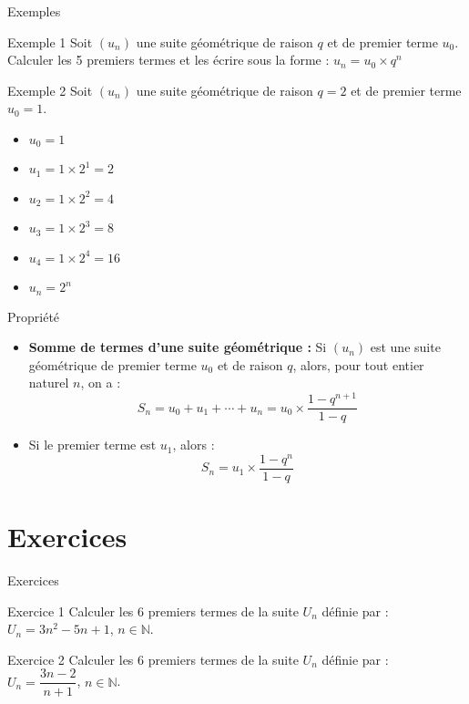 \documentclass{beamer}
\begin{document}
\begin{frame}{Exemples}
    \begin{exampleblock}{Exemple 1}
        Soit $\left(u_{n}\right)$ une suite géométrique de raison $q$ et de premier terme $u_{0}$. Calculer les 5 premiers termes et les écrire sous la forme : $u_{n}=u_{0}\times q^{n}$
    \end{exampleblock}
    \begin{exampleblock}{Exemple 2}
        Soit $\left(u_{n}\right)$ une suite géométrique de raison $q=2$ et de premier terme $u_{0}=1$. 
        \begin{itemize}
            \item $u_{0}=1$
            \item $u_{1}=1\times 2^{1}=2$
            \item $u_{2}=1\times 2^{2}=4$
            \item $u_{3}=1\times 2^{3}=8$
            \item $u_{4}=1\times 2^{4}=16$
            \item $u_{n}=2^{n}$
        \end{itemize}
    \end{exampleblock}
\end{frame}

\begin{frame}{Propriété}
    \begin{itemize}
        \item \textbf{Somme de termes d'une suite géométrique :}
            Si $\left(u_{n}\right)$ est une suite géométrique de premier terme $u_{0}$ et de raison $q$, alors, pour tout entier naturel $n$, on a :
            \[
            S_{n}=u_{0}+u_{1}+\cdots +u_{n}=u_{0}\times \dfrac{1-q^{n+1}}{1-q}
            \]
        \item Si le premier terme est $u_{1}$, alors :
            \[
            S_{n}=u_{1}\times \dfrac{1-q^{n}}{1-q}
            \]
    \end{itemize}
\end{frame}

\section{Exercices}
\begin{frame}{Exercices}
    \begin{exampleblock}{Exercice 1}
        Calculer les $6$ premiers termes de la suite $U_{n}$ définie par : \\
        $U_{n}=3n^{2} - 5n + 1$, $n \in \mathbb{N}$.
    \end{exampleblock}
    \begin{exampleblock}{Exercice 2}
        Calculer les $6$ premiers termes de la suite $U_{n}$ définie par : \\
        $U_{n}=\dfrac{3n-2}{n+1}$, $n \in \mathbb{N}$.
    \end{exampleblock}
\end{frame}
\end{document}
